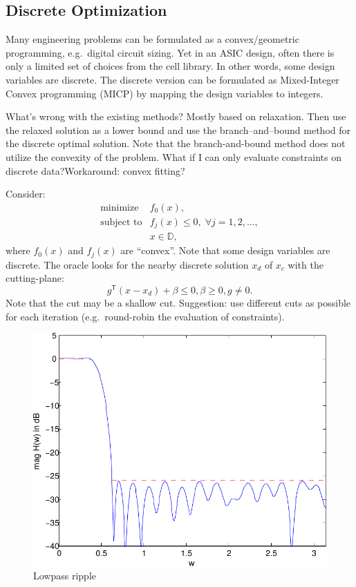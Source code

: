 \documentclass[final,leqno]{siamltex}
\begin{document}
\hypertarget{sec:discrete-optimization}{%
\subsection{Discrete Optimization}\label{sec:discrete-optimization}}

Many engineering problems can be formulated as a convex/geometric programming, e.g.~digital circuit sizing. Yet in an ASIC design, often there is only a limited set of choices from the cell library. In other words, some design variables are discrete. The discrete version can be formulated as Mixed-Integer Convex programming (MICP) by mapping the design variables to integers.

What's wrong with the existing methods? Mostly based on relaxation. Then use the relaxed solution as a lower bound and use the branch--and--bound method for the discrete optimal solution. Note that the branch-and-bound method does not utilize the convexity of the problem. What if I can only evaluate constraints on discrete data?Workaround: convex fitting?

Consider:
\[\begin{array}{ll}
        \text{minimize}      & f_0(x), \\
        \text{subject to}    & f_j(x) \leq 0, \; \forall j=1,2,\ldots, \\
                             & x \in \mathbb{D},
  \end{array}
\]
where \(f_0(x)\) and \(f_j(x)\) are ``convex''. Note that some design variables are discrete. The oracle looks for the nearby discrete solution \(x_d\) of \(x_c\) with the cutting-plane:
\[ g^\mathsf{T} (x - x_d) + \beta \leq 0, \beta \ge 0, g \neq 0.
\]
Note that the cut may be a shallow cut. Suggestion: use different cuts as possible for each iteration (e.g.~round-robin the evaluation of constraints).

\begin{figure}
\hypertarget{fig:lowpass_ripple}{%
\centering
\includegraphics{ellipsoid.files/lowpass_ripple.pdf}
\caption{Lowpass ripple}\label{fig:lowpass_ripple}
}
\end{figure}

\renewcommand\refname{References}

\end{document}
